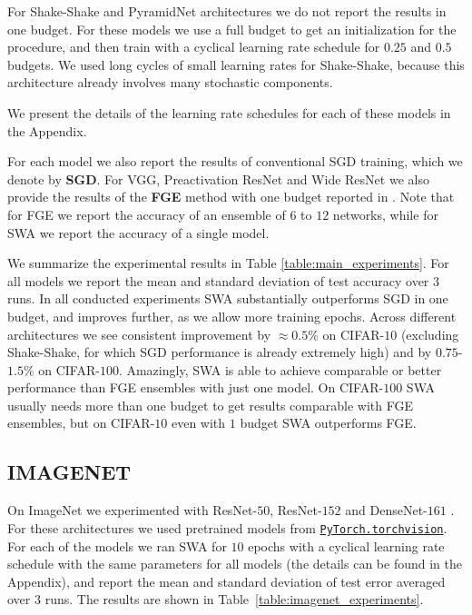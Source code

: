 \documentclass[letterpaper]{article}
\begin{document}
For Shake-Shake and PyramidNet architectures we do not report the results in one
budget. For these models we use a full budget to get an initialization for the
procedure, and then train with a cyclical learning rate schedule for $0.25$ 
and $0.5$ budgets. We used long cycles of small learning rates for Shake-Shake,
because this architecture already involves many stochastic components.

We present the details of the learning rate schedules for each of these models in 
the Appendix.

For each model we also report the results of conventional SGD training, 
which we denote by \textbf{SGD}. For VGG, Preactivation ResNet and Wide ResNet
we also provide the results of the \textbf{FGE} method with one budget reported in 
\citet{garipov2018}. Note that for FGE we report the accuracy of an ensemble 
of $6$ to $12$ networks, while for SWA we report the accuracy of a single model.

We summarize the experimental results in Table \ref{table:main_experiments}.
For all models we report the mean and standard deviation of test accuracy over $3$ runs. In all
conducted experiments SWA substantially outperforms SGD in one budget, and
improves further, as we allow more training epochs. Across different architectures
we see consistent improvement by $\approx 0.5\%$ on CIFAR-$10$ 
(excluding Shake-Shake, for which SGD performance is already extremely high) and
by $0.75$-$1.5\%$ on CIFAR-$100$. Amazingly, SWA is able to achieve comparable or
better performance than FGE ensembles with just one model. On CIFAR-$100$ SWA
usually needs more than one budget to get results comparable with FGE ensembles, 
but on CIFAR-$10$ even with $1$ budget SWA outperforms FGE.

\subsection{IMAGENET}
\label{sec:imagenet}

On ImageNet we experimented with ResNet-$50$, ResNet-$152$ \citep{he2016deep} and
DenseNet-$161$ \citep{huang2017densely}. For these architectures we used pretrained
models from \href{http://pytorch.org/docs/master/torchvision/models.html}{\texttt{PyTorch.torchvision}}.
For each of the models we ran SWA for $10$ epochs with a cyclical learning rate
schedule with the same parameters for all 
models (the details can be found in the Appendix), and  
report the mean and standard deviation of test error averaged over $3$ runs.
The results are shown in Table~\ref{table:imagenet_experiments}.
\end{document}
